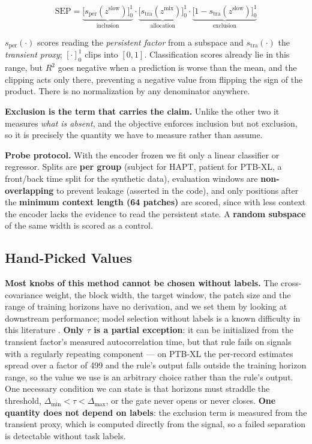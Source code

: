 \begin{equation}
\mathrm{SEP} = \underbrace{\big[s_{\text{per}}(z^{\mathrm{slow}})\big]_0^1}_{\text{inclusion}} \cdot \underbrace{\big[s_{\text{tra}}(z^{\mathrm{mix}})\big]_0^1}_{\text{allocation}} \cdot \underbrace{\big[1-s_{\text{tra}}(z^{\mathrm{slow}})\big]_0^1}_{\text{exclusion}}
\label{eq:sep}
\end{equation}

$s_{\text{per}}(\cdot)$ scores reading the \emph{persistent factor} from a subspace and $s_{\text{tra}}(\cdot)$ the \emph{transient proxy}; $[\cdot]_0^1$ clips into $[0,1]$. Classification scores already lie in this range, but $R^2$ goes negative when a prediction is worse than the mean, and the clipping acts only there, preventing a negative value from flipping the sign of the product. There is no normalization by any denominator anywhere.


\textbf{Exclusion is the term that carries the claim.} Unlike the other two it measures \emph{what is absent}, and the objective enforces inclusion but not exclusion, so it is precisely the quantity we have to measure rather than assume.


\textbf{Probe protocol.} With the encoder frozen we fit only a linear classifier or regressor. Splits are \textbf{per group} (subject for HAPT, patient for PTB-XL, a front/back time split for the synthetic data), evaluation windows are \textbf{non-overlapping} to prevent leakage (asserted in the code), and only positions after the \textbf{minimum context length (64 patches)} are scored, since with less context the encoder lacks the evidence to read the persistent state. A \textbf{random subspace} of the same width is scored as a control.

\subsection{Hand-Picked Values}
\label{sec:handpicked}

\textbf{Most knobs of this method cannot be chosen without labels.} The cross-covariance weight, the block width, the target window, the patch size and the range of training horizons have no derivation, and we set them by looking at downstream performance; model selection without labels is a known difficulty in this literature \cite{locatello2019}. \textbf{Only $\tau$ is a partial exception}: it can be initialized from the transient factor's measured autocorrelation time, but that rule fails on signals with a regularly repeating component --- on PTB-XL the per-record estimates spread over a factor of 499 and the rule's output falls outside the training horizon range, so the value we use is an arbitrary choice rather than the rule's output. One necessary condition we can state is that horizons must straddle the threshold, $\Delta_{\min}<\tau<\Delta_{\max}$, or the gate never opens or never closes. \textbf{One quantity does not depend on labels}: the exclusion term is measured from the transient proxy, which is computed directly from the signal, so a failed separation is detectable without task labels.
